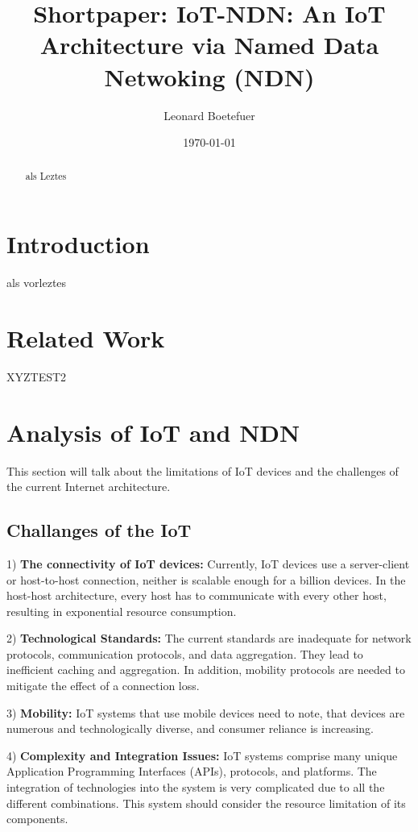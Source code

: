 \documentclass[conference]{IEEEtran}
\title{\textbf{Shortpaper:} IoT-NDN: An IoT Architecture via Named Data
Netwoking (NDN)\\}
\author{Leonard Boetefuer}
\date{\today}
\begin{document}
\maketitle

\begin{abstract}
als Leztes
\end{abstract}

\section{Introduction}
als vorleztes
\section{Related Work}
XYZTEST2
\section{Analysis of IoT and NDN}
This section will talk about the limitations of IoT devices
 and the challenges of the current Internet architecture.
\subsection{Challanges of the IoT}
1) \textbf{The connectivity of IoT devices:}
Currently, IoT devices use a server-client or host-to-host connection, 
neither is scalable enough for a billion devices.
In the host-host architecture, every host has to communicate with every other host, 
resulting in exponential resource consumption.

2) \textbf{Technological Standards:}
The current standards are inadequate for network protocols, communication protocols, 
and data aggregation. They lead to inefficient caching and aggregation. 
In addition, mobility protocols are needed to mitigate the effect of a connection loss. 

3) \textbf{Mobility:}
IoT systems that use mobile devices need to note, that devices are numerous and technologically diverse, 
and consumer reliance is increasing. 


4) \textbf{Complexity and Integration Issues:}
IoT systems comprise many unique Application Programming Interfaces (APIs), protocols, and platforms. 
The integration of technologies into the system is very complicated 
due to all the different combinations. 
This system should consider the resource limitation of its components.
\end{document}
